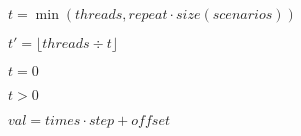 \documentclass{article}
\begin{document}
$ t = \min(\mathit{threads}, \mathit{repeat} \cdot \mathit{size}(\mathit{scenarios})) $
\pagebreak

$ t' = \lfloor \mathit{threads} \div t \rfloor $
\pagebreak

$ t=0 $
\pagebreak

$ t > 0 $
\pagebreak

$ \mathit{val} = \mathit{times} \cdot \mathit{step} + \mathit{offset} $
\pagebreak
\end{document}
